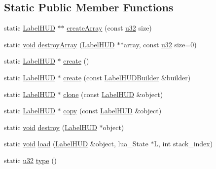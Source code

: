 \subsection*{Static Public Member Functions}
\begin{DoxyCompactItemize}
\item 
static \mbox{\hyperlink{classnjli_1_1_label_h_u_d}{Label\+H\+UD}} $\ast$$\ast$ \mbox{\hyperlink{classnjli_1_1_label_h_u_d_a439b7a8a4120389b3499a6d8526c681a}{create\+Array}} (const \mbox{\hyperlink{_util_8h_a10e94b422ef0c20dcdec20d31a1f5049}{u32}} size)
\item 
static \mbox{\hyperlink{_thread_8h_af1e856da2e658414cb2456cb6f7ebc66}{void}} \mbox{\hyperlink{classnjli_1_1_label_h_u_d_a733dac9e1b004210e1cc25b879a1ff26}{destroy\+Array}} (\mbox{\hyperlink{classnjli_1_1_label_h_u_d}{Label\+H\+UD}} $\ast$$\ast$array, const \mbox{\hyperlink{_util_8h_a10e94b422ef0c20dcdec20d31a1f5049}{u32}} size=0)
\item 
static \mbox{\hyperlink{classnjli_1_1_label_h_u_d}{Label\+H\+UD}} $\ast$ \mbox{\hyperlink{classnjli_1_1_label_h_u_d_ac78877c0e1b98c5837779544fe192b48}{create}} ()
\item 
static \mbox{\hyperlink{classnjli_1_1_label_h_u_d}{Label\+H\+UD}} $\ast$ \mbox{\hyperlink{classnjli_1_1_label_h_u_d_a7c23d00e02b8595433e000540378659c}{create}} (const \mbox{\hyperlink{classnjli_1_1_label_h_u_d_builder}{Label\+H\+U\+D\+Builder}} \&builder)
\item 
static \mbox{\hyperlink{classnjli_1_1_label_h_u_d}{Label\+H\+UD}} $\ast$ \mbox{\hyperlink{classnjli_1_1_label_h_u_d_a19ec4a7244c92dc3bac335d4247e80be}{clone}} (const \mbox{\hyperlink{classnjli_1_1_label_h_u_d}{Label\+H\+UD}} \&object)
\item 
static \mbox{\hyperlink{classnjli_1_1_label_h_u_d}{Label\+H\+UD}} $\ast$ \mbox{\hyperlink{classnjli_1_1_label_h_u_d_ad592872b1e59d73aa8d3dfcaec1daec9}{copy}} (const \mbox{\hyperlink{classnjli_1_1_label_h_u_d}{Label\+H\+UD}} \&object)
\item 
static \mbox{\hyperlink{_thread_8h_af1e856da2e658414cb2456cb6f7ebc66}{void}} \mbox{\hyperlink{classnjli_1_1_label_h_u_d_aa285d743d92bcf2dbb467dfeff1ea41a}{destroy}} (\mbox{\hyperlink{classnjli_1_1_label_h_u_d}{Label\+H\+UD}} $\ast$object)
\item 
static \mbox{\hyperlink{_thread_8h_af1e856da2e658414cb2456cb6f7ebc66}{void}} \mbox{\hyperlink{classnjli_1_1_label_h_u_d_a091ed0d6dd97cc37f87733951c87b67c}{load}} (\mbox{\hyperlink{classnjli_1_1_label_h_u_d}{Label\+H\+UD}} \&object, lua\+\_\+\+State $\ast$L, int stack\+\_\+index)
\item 
static \mbox{\hyperlink{_util_8h_a10e94b422ef0c20dcdec20d31a1f5049}{u32}} \mbox{\hyperlink{classnjli_1_1_label_h_u_d_af0e2d204e906dff5fac5e5f744477f35}{type}} ()
\end{DoxyCompactItemize}
